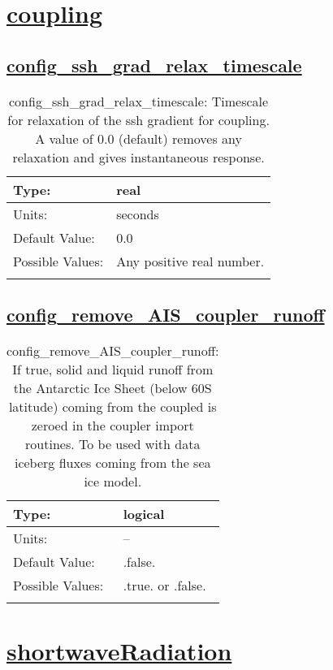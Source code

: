 \section[coupling]{\hyperref[sec:nm_tab_coupling]{coupling}}
\label{sec:nm_sec_coupling}
\subsection[config\_ssh\_grad\_relax\_timescale]{\hyperref[sec:nm_tab_coupling]{config\_ssh\_grad\_relax\_timescale}}
\label{subsec:nm_sec_config_ssh_grad_relax_timescale}
\begin{center}
\begin{longtable}{| p{2.0in} || p{4.0in} |}
    \hline
    Type: & real \\
    \hline
    Units: & \si{seconds} \\
    \hline
    Default Value: & 0.0 \\
    \hline
    Possible Values: & Any positive real number. \\
    \hline
    \caption{config\_ssh\_grad\_relax\_timescale: Timescale for relaxation of the ssh gradient for coupling. A value of 0.0 (default) removes any relaxation and gives instantaneous response.}
\end{longtable}
\end{center}
\subsection[config\_remove\_AIS\_coupler\_runoff]{\hyperref[sec:nm_tab_coupling]{config\_remove\_AIS\_coupler\_runoff}}
\label{subsec:nm_sec_config_remove_AIS_coupler_runoff}
\begin{center}
\begin{longtable}{| p{2.0in} || p{4.0in} |}
    \hline
    Type: & logical \\
    \hline
    Units: & -- \\
    \hline
    Default Value: & .false. \\
    \hline
    Possible Values: & .true. or .false. \\
    \hline
    \caption{config\_remove\_AIS\_coupler\_runoff: If true, solid and liquid runoff from the Antarctic Ice Sheet (below 60S latitude) coming from the coupled is zeroed in the coupler import routines.  To be used with data iceberg fluxes coming from the sea ice model.}
\end{longtable}
\end{center}
\section[shortwaveRadiation]{\hyperref[sec:nm_tab_shortwaveRadiation]{shortwaveRadiation}}
\label{sec:nm_sec_shortwaveRadiation}
